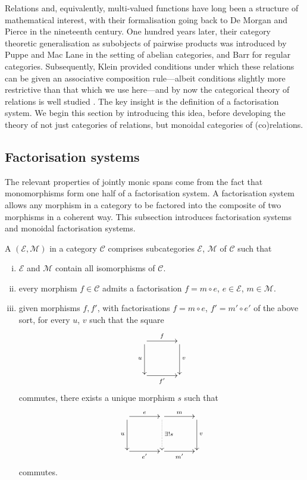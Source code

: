 Relations and, equivalently, multi-valued functions have long been a structure
of mathematical interest, with their formalisation going back to De Morgan
\cite{DeM60} and Pierce \cite{Pie70} in the nineteenth century. One hundred
years later, their category theoretic generalisation as subobjects of pairwise
products was introduced by Puppe \cite{Pup62} and Mac Lane \cite{Mac63} in the
setting of abelian categories, and Barr \cite{Bar70} for regular categories.
Subsequently, Klein \cite{Kle70} provided conditions under which these relations
can be given an associative composition rule---albeit conditions slightly more
restrictive than that which we use here---and by now the categorical theory of
relations is well studied \cite{FS90, Mil00, JW00}.  The key insight is the
definition of a factorisation system. We begin this section by introducing this
idea, before developing the theory of not just categories of relations, but
monoidal categories of (co)relations.

\subsection{Factorisation systems}
The relevant properties of jointly monic spans come from the fact that
monomorphisms form one half of a factorisation system. A factorisation system
allows any morphism in a category to be factored into the composite of two
morphisms in a coherent way. This subsection introduces factorisation systems
and monoidal factorisation systems.

\begin{definition}
  A  $(\mathcal E,\mathcal M)$ in a category
  $\mathcal C$ comprises subcategories $\mathcal E$, $\mathcal M$ of $\mathcal
  C$ such that
  \begin{enumerate}[(i)]
    \item $\mathcal E$ and $\mathcal M$ contain all isomorphisms of $\mathcal
      C$.
    \item  every morphism $f \in \mathcal C$ admits a factorisation $f=m \circ
      e$, $e \in \mathcal E$, $m \in \mathcal M$.
\item given morphisms $f,f'$, with factorisations $f = m \circ e$, $f' = m' \circ
  e'$ of the above sort, for every $u$, $v$ such that the square
  \[
    \xymatrixcolsep{3pc}
    \xymatrixrowsep{3pc}
    \xymatrix{
       \ar[r]^f \ar[d]_u &  \ar[d]^v \\
       \ar[r]_{f'} & 
    }
  \]
  commutes, there exists a unique morphism $s$ such that
  \[
    \xymatrixcolsep{3pc}
    \xymatrixrowsep{3pc}
    \xymatrix{
      \ar[r]^e \ar[d]_u & \ar[r]^m \ar@{.>}[d]^{\exists! s} &  \ar[d]^v \\
       \ar[r]_{e'}& \ar[r]_{m'} & 
    }
  \]
  commutes.
  \end{enumerate}
\end{definition}

